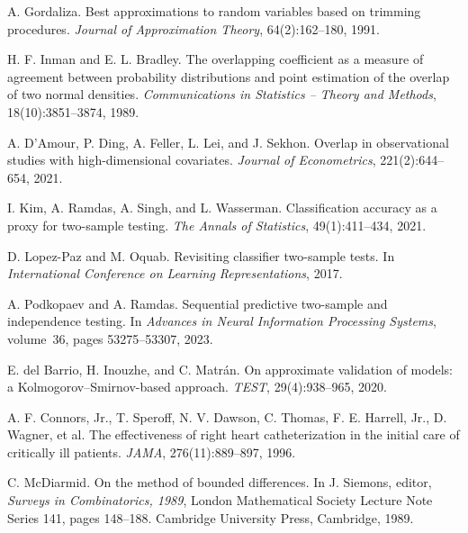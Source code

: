 A. Gordaliza.
\newblock Best approximations to random variables based on trimming procedures.
\newblock \emph{Journal of Approximation Theory}, 64(2):162--180, 1991.

H. F. Inman and E. L. Bradley.
\newblock The overlapping coefficient as a measure of agreement between probability distributions and point estimation of the overlap of two normal densities.
\newblock \emph{Communications in Statistics -- Theory and Methods}, 18(10):3851--3874, 1989.

A. D'Amour, P. Ding, A. Feller, L. Lei, and J. Sekhon.
\newblock Overlap in observational studies with high-dimensional covariates.
\newblock \emph{Journal of Econometrics}, 221(2):644--654, 2021.

I. Kim, A. Ramdas, A. Singh, and L. Wasserman.
\newblock Classification accuracy as a proxy for two-sample testing.
\newblock \emph{The Annals of Statistics}, 49(1):411--434, 2021.

D. Lopez-Paz and M. Oquab.
\newblock Revisiting classifier two-sample tests.
\newblock In \emph{International Conference on Learning Representations}, 2017.

A. Podkopaev and A. Ramdas.
\newblock Sequential predictive two-sample and independence testing.
\newblock In \emph{Advances in Neural Information Processing Systems}, volume~36, pages 53275--53307, 2023.

E. del Barrio, H. Inouzhe, and C. Matr\'an.
\newblock On approximate validation of models: a Kolmogorov--Smirnov-based approach.
\newblock \emph{TEST}, 29(4):938--965, 2020.

A. F. Connors, Jr., T. Speroff, N. V. Dawson, C. Thomas, F. E. Harrell, Jr., D. Wagner, et al.
\newblock The effectiveness of right heart catheterization in the initial care of critically ill patients.
\newblock \emph{JAMA}, 276(11):889--897, 1996.

C. McDiarmid.
\newblock On the method of bounded differences.
\newblock In J. Siemons, editor, \emph{Surveys in Combinatorics, 1989}, London Mathematical Society Lecture Note Series 141, pages 148--188. Cambridge University Press, Cambridge, 1989.

